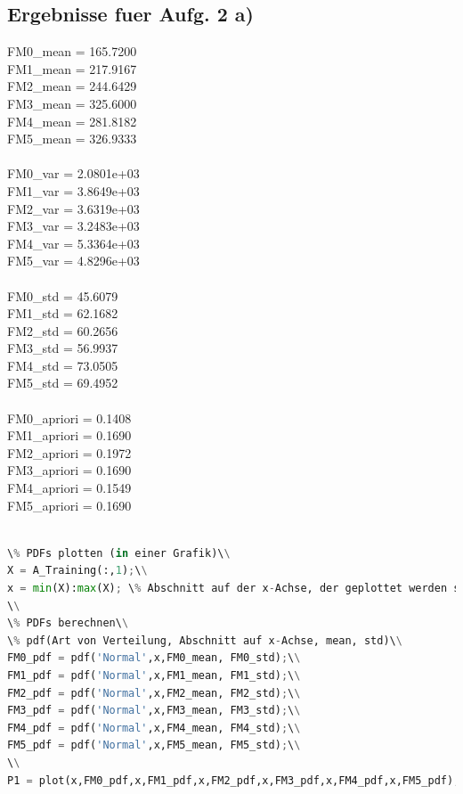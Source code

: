\documentclass[12pt]{article}
\begin{document}
\subsection{Ergebnisse fuer Aufg. 2 a)}

FM0\_mean = 165.7200\\
FM1\_mean = 217.9167\\
FM2\_mean = 244.6429\\
FM3\_mean = 325.6000\\
FM4\_mean = 281.8182\\
FM5\_mean = 326.9333\\
\\
FM0\_var = 2.0801e+03\\
FM1\_var = 3.8649e+03\\
FM2\_var = 3.6319e+03\\
FM3\_var = 3.2483e+03\\
FM4\_var = 5.3364e+03\\
FM5\_var = 4.8296e+03\\
\\
FM0\_std = 45.6079\\
FM1\_std = 62.1682\\
FM2\_std = 60.2656\\
FM3\_std = 56.9937\\
FM4\_std = 73.0505\\
FM5\_std = 69.4952\\
\\
FM0\_apriori = 0.1408\\
FM1\_apriori = 0.1690\\
FM2\_apriori = 0.1972\\
FM3\_apriori = 0.1690\\
FM4\_apriori = 0.1549\\
FM5\_apriori = 0.1690\\
\\
\begin{lstlisting}[language=Python]
\% PDFs plotten (in einer Grafik)\\
X = A_Training(:,1);\\
x = min(X):max(X); \% Abschnitt auf der x-Achse, der geplottet werden soll\\
\\
\% PDFs berechnen\\
\% pdf(Art von Verteilung, Abschnitt auf x-Achse, mean, std)\\
FM0_pdf = pdf('Normal',x,FM0_mean, FM0_std);\\
FM1_pdf = pdf('Normal',x,FM1_mean, FM1_std);\\
FM2_pdf = pdf('Normal',x,FM2_mean, FM2_std);\\
FM3_pdf = pdf('Normal',x,FM3_mean, FM3_std);\\
FM4_pdf = pdf('Normal',x,FM4_mean, FM4_std);\\
FM5_pdf = pdf('Normal',x,FM5_mean, FM5_std);\\
\\
P1 = plot(x,FM0_pdf,x,FM1_pdf,x,FM2_pdf,x,FM3_pdf,x,FM4_pdf,x,FM5_pdf);\\
\end{lstlisting}
\end{document}
